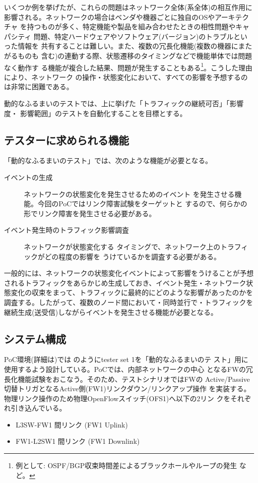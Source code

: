 いくつか例を挙げたが、これらの問題はネットワーク全体(系全体)の相互作用に
影響される。ネットワークの場合はベンダや機器ごとに独自のOSやアーキテクチャ
を持つものが多く、特定機能や製品を組み合わせたときの相性問題やキャパシティ
問題、特定ハードウェアやソフトウェア(バージョン)のトラブルといった情報を
共有することは難しい。また、複数の冗長化機能(複数の機器にまたがるものも
含む)の連動する際、状態遷移のタイミングなどで機能単体では問題なく動作す
る機能が複合した結果、問題が発生することもある\footnote{例として:
OSPF/BGP収束時間差によるブラックホールやループの発生
\cite{j3g14-packet-forwarding}など。}。こうした理由により、ネットワーク
の操作・状態変化において、すべての影響を予想するのは非常に困難である。

動的なふるまいのテストでは、上に挙げた「トラフィックの継続可否」「影響度・
影響範囲」のテストを自動化することを目標とする。

  \subsection{テスターに求められる機能}

「動的なふるまいのテスト」では、次のような機能が必要となる。
\begin{description}
 \item[イベントの生成] ネットワークの状態変化を発生させるためのイベント
            を発生させる機能。今回のPoCではリンク障害試験をターゲットと
            するので、何らかの形でリンク障害を発生させる必要がある。
 \item[イベント発生時のトラフィック影響調査] ネットワークが状態変化する
            タイミングで、ネットワーク上のトラフィックがどの程度の影響を
            うけているかを調査する必要がある。
\end{description}

一般的には、ネットワークの状態変化イベントによって影響をうけることが予想
されるトラフィックをあらかじめ生成しておき、イベント発生・ネットワーク状
態変化の収束をまって、トラフィックに最終的にどのような影響があったのかを
調査する。したがって、複数のノード間において・同時並行で・トラフィックを
継続生成(送受信)しながらイベントを発生させる機能が必要となる。

  \subsection{システム構成}
PoC環境(詳細は)では
のようにtester set 1を「動的なふるまいのテ
スト」用に使用するよう設計している。PoCでは、\yo 内部ネットワークの中心
となるFWの冗長化機能試験をおこなう。そのため、テストシナリオではFWの
Active/Passive切替トリガとなるActive側(FW1)リンクダウン/リンクアップ操作
を実装する。物理リンク操作のため物理OpenFlowスイッチ(OFS1)へ以下の2リン
クをそれぞれ引き込んでいる。
\begin{itemize}
 \item L3SW-FW1 間リンク (FW1 Uplink)
 \item FW1-L2SW1 間リンク (FW1 Downlink)
\end{itemize}


